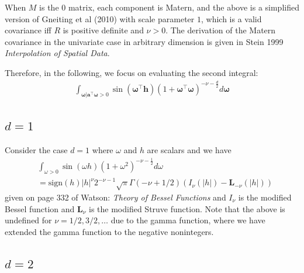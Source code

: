 \documentclass[11pt]{article}
\newcommand{\vint}{\boldsymbol{\omega}}
\newcommand{\vpla}{\boldsymbol{a}}
\begin{document}
When $M$ is the $0$ matrix, each component is Matern, and the above is a simplified version of Gneiting et al (2010) with scale parameter $1$, which is a valid covariance iff $R$ is positive definite and $\nu > 0$. The derivation of the Matern covariance in the univariate case in arbitrary dimension is given in Stein 1999 \textit{Interpolation of Spatial Data}.



 Therefore, in the following, we focus on evaluating the second integral: \begin{align}
\int_{\vint | \vpla^\top\vint > 0}\sin(\vint^\top \boldsymbol{h})(1 + \vint^\top \vint)^{-\nu- \frac{d}{2}} d\vint \label{toughintegral}
\end{align}

% 

\subsection{$d=1$}
 Consider the case $d=1$ where $\omega$ and $h$ are scalars and we have 
  \begin{align*}
&\int_{\omega > 0}\sin(\omega h)(1 + \omega^2)^{-\nu- \frac{1}{2}} d\omega \\
&= \textrm{sign}(h) |h|^{\nu} 2^{-\nu-1} \sqrt{\pi} \Gamma(-\nu + 1/2)\left(I_{\nu}(|h|) - \boldsymbol{L}_{-\nu} (|h|)\right)
 \end{align*}given on page 332 of Watson: \textit{Theory of Bessel Functions} and $I_\nu$ is the modified Bessel function and $\boldsymbol{L}_\nu$ is the modified Struve function. Note that the above is undefined for $\nu = 1/2, 3/2, \dots$ due to the gamma function, where we have extended the gamma function to the negative nonintegers. 
 
 \subsection{$d=2$}
 
\end{document}

